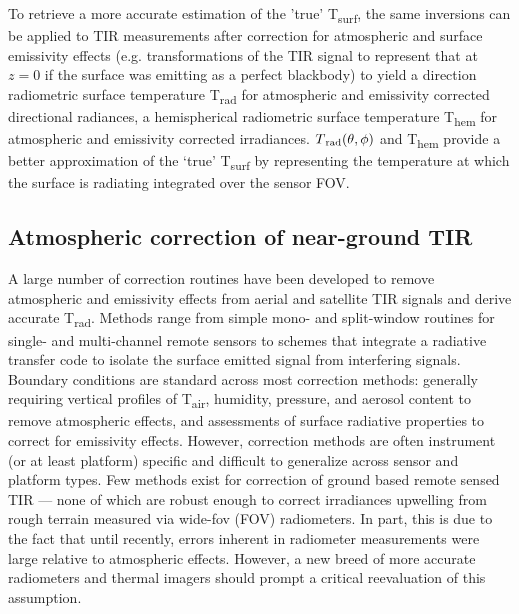 To retrieve a more accurate estimation of the 'true' T\textsubscript{surf}, the same inversions can be applied to TIR measurements after correction for atmospheric and surface emissivity effects (e.g. transformations of the TIR signal to represent that at $ z = 0 $ if the surface was emitting as a perfect blackbody) to yield a direction radiometric surface temperature T\textsubscript{rad} for atmospheric and emissivity corrected directional radiances, a hemispherical radiometric surface temperature T\textsubscript{hem} for atmospheric and emissivity corrected irradiances. $ T\textsubscript{rad} (\theta, \phi) $ and T\textsubscript{hem} provide a better approximation of the ‘true’ T\textsubscript{surf} by representing the temperature at which the surface is radiating integrated over the sensor FOV.


\subsection{Atmospheric correction of near-ground TIR} \label{Atmospheric correction of near-ground TIR}

A large number of correction routines have been developed to remove atmospheric and emissivity effects from aerial and satellite TIR signals and derive accurate T\textsubscript{rad}. Methods range from simple mono- \cite{Qin2001} and split-window \cite{Wan1996} routines for single- and multi-channel remote sensors to schemes that integrate a radiative transfer code to isolate the surface emitted signal from interfering signals. Boundary conditions are standard across most correction methods: generally requiring vertical profiles of T\textsubscript{air}, humidity, pressure, and aerosol content to remove atmospheric effects, and assessments of surface radiative properties to correct for emissivity effects. However, correction methods are often instrument (or at least platform) specific and difficult to generalize across sensor and platform types. Few methods exist for correction of ground based remote sensed TIR --- none of which are robust enough to correct irradiances upwelling from rough terrain measured via wide-\gls{fov} (FOV) radiometers. In part, this is due to the fact that until recently, errors inherent in radiometer measurements were large relative to atmospheric effects. However, a new breed of more accurate radiometers and thermal imagers should prompt a critical reevaluation of this assumption.

